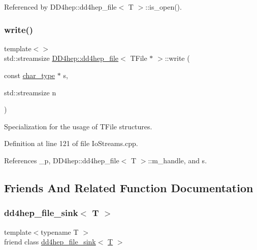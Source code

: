 Referenced by D\+D4hep\+::dd4hep\+\_\+file$<$ T $>$\+::is\+\_\+open().

\hypertarget{class_d_d4hep_1_1dd4hep__file_ab165475b5ef2872deda4b955384063ff}{}\label{class_d_d4hep_1_1dd4hep__file_ab165475b5ef2872deda4b955384063ff} 
\subsubsection{\texorpdfstring{write()}{write()}\hspace{0.1cm}{\footnotesize\ttfamily [3/3]}}
{\footnotesize\ttfamily template$<$$>$ \\
std\+::streamsize \hyperlink{class_d_d4hep_1_1dd4hep__file}{D\+D4hep\+::dd4hep\+\_\+file}$<$ T\+File $\ast$ $>$\+::write (\begin{DoxyParamCaption}\item[{const \hyperlink{class_d_d4hep_1_1dd4hep__file_aef4242f7f2fe15a59f7bf7a8f6ba24d5}{char\+\_\+type} $\ast$}]{s,  }\item[{std\+::streamsize}]{n }\end{DoxyParamCaption})}



Specialization for the usage of T\+File structures. 



Definition at line 121 of file Io\+Streams.\+cpp.



References \+\_\+p, D\+D4hep\+::dd4hep\+\_\+file$<$ T $>$\+::m\+\_\+handle, and s.



\subsection{Friends And Related Function Documentation}
\hypertarget{class_d_d4hep_1_1dd4hep__file_a0fff7b3c8e8c9c913c387a26c6829a36}{}\label{class_d_d4hep_1_1dd4hep__file_a0fff7b3c8e8c9c913c387a26c6829a36} 
\subsubsection{\texorpdfstring{dd4hep\+\_\+file\+\_\+sink$<$ T $>$}{dd4hep\_file\_sink< T >}}
{\footnotesize\ttfamily template$<$typename T $>$ \\
friend class \hyperlink{class_d_d4hep_1_1dd4hep__file__sink}{dd4hep\+\_\+file\+\_\+sink}$<$ \hyperlink{class_t}{T} $>$\hspace{0.3cm}{\ttfamily [friend]}}



